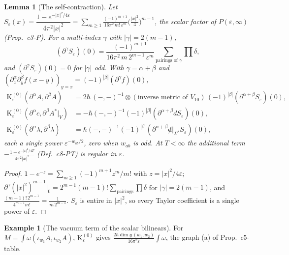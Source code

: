 \documentclass[11pt]{article}
\numberwithin{equation}{section}
\theoremstyle{plain}
\newtheorem{lemma}[theorem]{Lemma}
\theoremstyle{definition}
\newtheorem{example}[theorem]{Example}
\begin{document}
\begin{lemma}[The self-contraction]
\label{lem:tl-k0}
Let $S_\varepsilon(x)=\dfrac{1-e^{-|x|^2/4\varepsilon}}{4\pi^2|x|^2}=\displaystyle\sum_{m\ge1}\frac{(-1)^{m+1}}{16\pi^2\,m!\,\varepsilon^m}\Big(\frac{|x|^2}4\Big)^{m-1}$, the scalar factor of $P(\varepsilon,\infty)$ (Prop.~c3-P). For a multi-index $\gamma$ with $|\gamma|=2(m-1)$,
\[
(\partial^\gamma S_\varepsilon)(0)=\frac{(-1)^{m+1}}{16\pi^2\,m\,2^{m-1}\,\varepsilon^m}\sum_{\text{pairings of }\gamma}\prod\delta ,
\]
and $(\partial^\gamma S_\varepsilon)(0)=0$ for $|\gamma|$ odd. With $\gamma=\alpha+\beta$ and $(\partial^\alpha_x\partial^\beta_yf(x-y))_{y=x}=(-1)^{|\beta|}(\partial^\gamma f)(0)$,
\[
\begin{aligned}
\mathrm K^{(0)}_\varepsilon(\partial^\alpha A,\partial^\beta A)&=2\hbar\,(-,-)^{-1}\otimes(\text{inverse metric of }V_{10})\,(-1)^{|\beta|}(\partial^{\alpha+\beta}S_\varepsilon)(0),\\
\mathrm K^{(0)}_\varepsilon(\partial^\alpha c,\partial^\beta A^*|_V)&=-\hbar(-,-)^{-1}(-1)^{|\beta|}(\partial^{\alpha+\beta}dS_\varepsilon)(0),\\
\mathrm K^{(0)}_\varepsilon(\partial^\alpha\lambda,\partial^\beta\lambda)&=\hbar(-,-)^{-1}(-1)^{|\beta|}(\partial^{\alpha+\beta}{\not d}|_{\Sigma^*}S_\varepsilon)(0),
\end{aligned}
\]
each a single power $\varepsilon^{-w_{ab}/2}$, zero when $w_{ab}$ is odd. At $T<\infty$ the additional term $-\frac{1-e^{-|x|^2/4T}}{4\pi^2|x|^2}$ (Def.~c8-PT) is regular in $\varepsilon$.
\end{lemma}

\begin{proof}
$1-e^{-z}=\sum_{m\ge1}(-1)^{m+1}z^m/m!$ with $z=|x|^2/4\varepsilon$; $\partial^\gamma(|x|^2)^{m-1}|_0=2^{m-1}(m-1)!\sum_{\text{pairings}}\prod\delta$ for $|\gamma|=2(m-1)$, and $\frac{(m-1)!\,2^{m-1}}{4^{m-1}m!}=\frac1{m\,2^{m-1}}$. $S_\varepsilon$ is entire in $|x|^2$, so every Taylor coefficient is a single power of $\varepsilon$.
\end{proof}

\begin{example}[The vacuum term of the scalar bilinears]
For $M=\int\omega(\iota_{w_1}A,\iota_{w_2}A)$, $\mathrm K^{(0)}_\varepsilon$ gives $\frac{2\hbar\dim\mathfrak g\,(w_1,w_2)}{16\pi^2\varepsilon}\int\omega$, the graph (a) of Prop.~c5-table.
\end{example}
\end{document}
